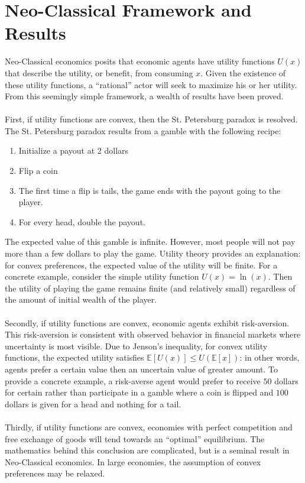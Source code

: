\documentclass{article}
\begin{document}
\section{Neo-Classical Framework and Results}
Neo-Classical economics posits that economic agents have utility functions \(U(x)\) that describe the utility, or benefit, from consuming \(x\).  Given the existence of these utility functions, a ``rational'' actor will seek to maximize his or her utility.  From this seemingly simple framework, a wealth of results have been proved.  
\\
\\
First, if utility functions are convex, then the St. Petersburg paradox is resolved.  The St. Petersburg paradox results from a gamble with the following recipe:
\begin{enumerate}
	\item Initialize a payout at 2 dollars
	\item Flip a coin
	\item The first time a flip is tails, the game ends with the payout going to the player.
	\item For every head, double the payout.
\end{enumerate}
The expected value of this gamble is infinite.  However, most people will not pay more than a few dollars to play the game.  Utility theory provides an explanation: for convex preferences, the expected value of the utility will be finite.  For a concrete example, consider the simple utility function \(U(x)=\ln(x)\).  Then the utility of playing the game remains finite (and relatively small) regardless of the amount of initial wealth of the player.  
\\
\\
Secondly, if utility functions are convex, economic agents exhibit risk-aversion.  This risk-aversion is consistent with observed behavior in financial markets where uncertainty is most visible.  Due to Jenson's inequality, for convex utility functions, the expected utility satisfies \(\mathbb{E}\left[U(x)\right] \leq U(\mathbb{E}[x])\): in other words, agents prefer a certain value then an uncertain value of greater amount.  To provide a concrete example, a risk-averse agent would prefer to receive \(50\) dollars for certain rather than participate in a gamble where a coin is flipped and \(100\) dollars is given for a head and nothing for a tail.  
\\
\\
Thirdly, if utility functions are convex, economies with perfect competition and free exchange of goods will tend towards an ``optimal'' equilibrium.  The mathematics behind this conclusion are complicated, but is a seminal result in Neo-Classical economics.  In large economies, the assumption of convex preferences may be relaxed.  
\end{document}
